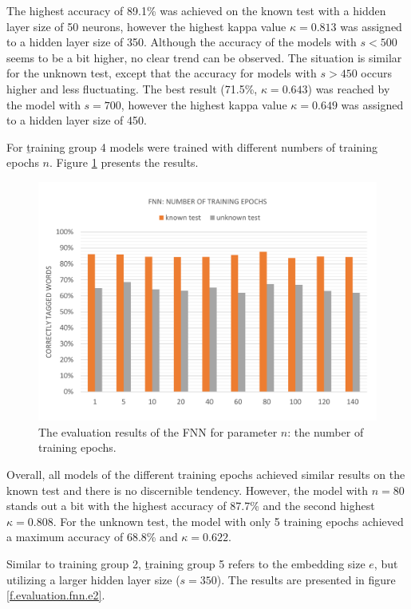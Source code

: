 The highest accuracy of 89.1\% was achieved on the known test with a hidden layer size of 50 neurons, however the highest kappa value $\kappa=0.813$ was assigned to a hidden layer size of 350. Although the accuracy of the models with $s<500$ seems to be a bit higher, no clear trend can be observed. The situation is similar for the unknown test, except that the accuracy for models with $s>450$ occurs higher and less fluctuating. The best result (71.5\%, $\kappa=0.643$) was reached by the model with $s=700$, however the highest kappa value $\kappa=0.649$ was assigned to a hidden layer size of 450.

For \b{training group 4} models were trained with different numbers of training epochs $n$. Figure \ref{f.evaluation.fnn.n} presents the results.

\begin{figure}[H]
	\hspace{-5mm}\includegraphics[width=1.07\textwidth]{images/evaluation_fnn_n}
	\caption[FNN Evaluation: Number of Training Epochs]{The evaluation results of the FNN for parameter $n$: the number of training epochs.}
	\label{f.evaluation.fnn.n}
\end{figure}

Overall, all models of the different training epochs achieved similar results on the known test and there is no discernible tendency. However, the model with $n=80$ stands out a bit with the highest accuracy of 87.7\% and the second highest $\kappa=0.808$. For the unknown test, the model with only 5 training epochs achieved a maximum accuracy of 68.8\% and $\kappa=0.622$.

Similar to training group 2, \b{training group 5} refers to the embedding size $e$, but utilizing a larger hidden layer size ($s=350$). The results are presented in figure {\ref{f.evaluation.fnn.e2}}.

